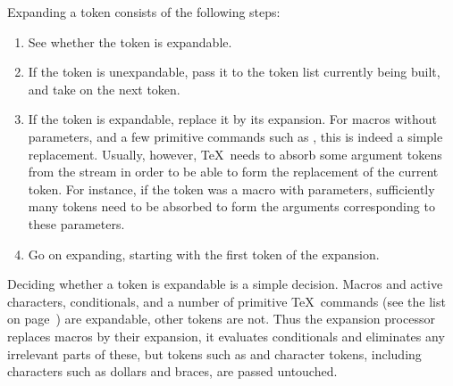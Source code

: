 \documentclass{book}
\begin{document}
Expanding a token consists of the following steps:
\begin{enumerate}
\item See whether the token is expandable. 
\item If the token is unexpandable, pass it to the token
      list currently being built, and take on the next token. 

\item If the token is expandable, replace it by its expansion.
      For macros without parameters, and a few primitive commands
      such as , this is indeed a simple replacement.
      Usually, however, \TeX\ needs to absorb some argument tokens from
      the stream in order to be able to form the replacement
      of the current token.
      For instance, if the token was a macro with parameters,
      sufficiently many tokens need to be absorbed to form
      the arguments corresponding to  these parameters.

\item Go on expanding, starting with the first token of the
      expansion. 
\end{enumerate}
%
Deciding whether a token is expandable is
a simple decision. Macros and active characters, 
conditionals, and a number of primitive \TeX\ commands
(see the list on page~\pageref{expand:lijst})
are expandable, other tokens are not.
Thus the expansion processor replaces macros by their expansion,
it evaluates conditionals and eliminates any irrelevant parts of 
these, but tokens such as  and character tokens,
including characters such as dollars and braces, are passed untouched.
\end{document}
